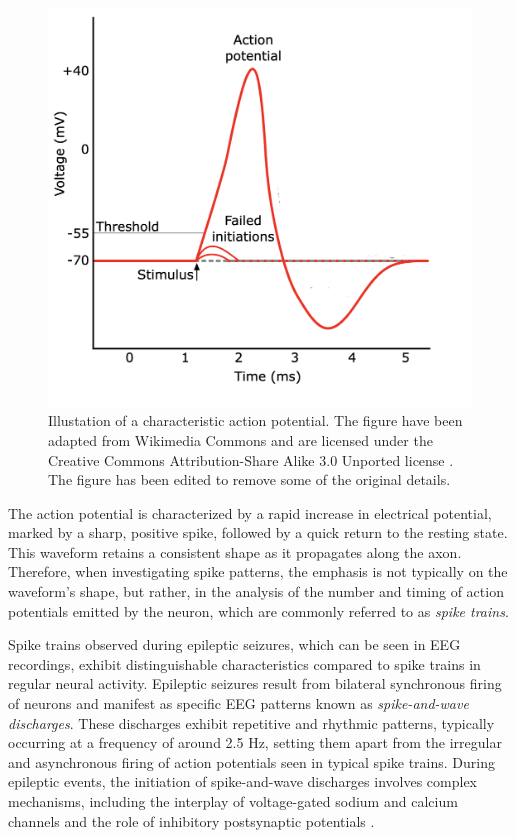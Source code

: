 \documentclass[a4paper, UKenglish, 11pt]{uiomaster}
\begin{document}
\begin{figure}
    \centering
    \includegraphics[width=0.8\linewidth]{figures/action_potential.png}
    \caption{Illustation of a characteristic action potential. The figure have been adapted from Wikimedia Commons and are licensed under the Creative Commons Attribution-Share Alike 3.0 Unported license \cite{wikimedia-action}. The figure has been edited to remove some of the original details.}
    \label{fig:action_potential}
\end{figure}

The action potential is characterized by a rapid increase in electrical potential, marked by a sharp, positive spike, followed by a quick return to the resting state. This waveform retains a consistent shape as it propagates along the axon.  Therefore, when investigating spike patterns, the emphasis is not typically on the waveform's shape, but rather, in the analysis of the number and timing of action potentials emitted by the neuron, which are commonly referred to as \emph{spike trains}.


Spike trains observed during epileptic seizures, which can be seen in EEG recordings, exhibit distinguishable characteristics compared to spike trains in regular neural activity. Epileptic seizures result from bilateral synchronous firing of neurons and manifest as specific EEG patterns known as \emph{spike-and-wave discharges}. These discharges exhibit repetitive and rhythmic patterns, typically occurring at a frequency of around 2.5 Hz, setting them apart from the irregular and asynchronous firing of action potentials seen in typical spike trains\cite{gerstner2014neuronal}. During epileptic events, the initiation of spike-and-wave discharges involves complex mechanisms, including the interplay of voltage-gated sodium and calcium channels and the role of inhibitory postsynaptic potentials \cite{wiki:electroencephalography}. 
\end{document}
